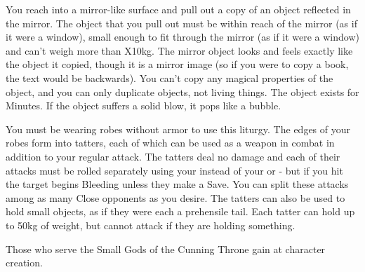 {You reach into a mirror-like surface and pull out a copy of an object reflected in the mirror. The object that you pull out must be within reach of the mirror (as if it were a window), small enough to fit through the mirror (as if it were a window) and can't weigh more than \DICE X10kg. The mirror object looks and feels exactly like the object it copied, though it is a mirror image (so if you were to copy a book, the text would be backwards).  You can't copy any magical properties of the object, and you can only duplicate objects, not living things.  The object exists for \SUMDICE Minutes.  If the object suffers a solid blow, it pops like a bubble.

\LITURGY [
  Name= Tattered Robe,
  Link=king-in-yellow-liturgy-tattered-robe,
  Paradigm= Entropy ,
  Save=  Y (negates Bleeding) ,
  Duration= Combat or \SUMDICE Minutes ,
  Counter=  n/a  ,
  Keywords= None ,
  Target=   Self
]



You must be wearing robes without armor to use this liturgy.  The edges of your robes form into \DICE tatters, each of which can be used as a weapon in combat in addition to your regular attack. The tatters deal no damage and each of their attacks must be rolled separately using your \FOC instead of your \VIG or \DEX - but if you hit the target begins Bleeding unless they make a Save.  You can split these attacks among as many Close opponents as you desire.
The tatters can also be used to hold small objects, as if they were each a prehensile tail.  Each tatter can hold up to 50kg of weight, but cannot attack if they are holding something.

\newpage





Those who serve the Small Gods of the Cunning Throne gain \DCUP \INT at character creation.







}
